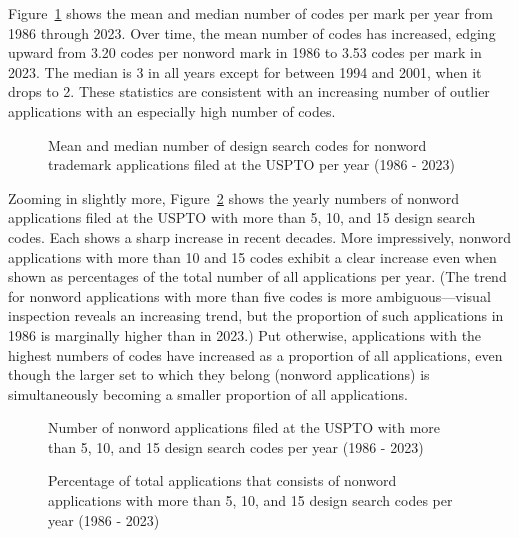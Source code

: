 \documentclass[letterpaper, 11pt, oneside]{article}
\begin{document}
%

Figure~\ref{fig:4} shows the mean and median number of codes per mark per year from 1986 through 2023. Over time, the mean number of codes has increased, edging upward from 3.20 codes per nonword mark in 1986 to 3.53 codes per mark in 2023. The median is 3 in all years except for between 1994 and 2001, when it drops to 2. These statistics are consistent with an increasing number of outlier applications with an especially high number of codes.

\begin{figure}[H]
\centering

\caption{\label{fig:4} Mean and median number of design search codes for nonword trademark applications filed at the USPTO per year (1986 - 2023)}
\end{figure}

Zooming in slightly more, Figure~\ref{fig:5} shows the yearly numbers of nonword applications filed at the USPTO with more than 5, 10, and 15 design search codes. Each shows a sharp increase in recent decades. More impressively, nonword applications with more than 10 and 15 codes exhibit a clear increase even when shown as percentages of the total number of all applications per year. (The trend for nonword applications with more than five codes is more ambiguous—visual inspection reveals an increasing trend, but the proportion of such applications in 1986 is marginally higher than in 2023.) Put otherwise, applications with the highest numbers of codes have increased as a proportion of all applications, even though the larger set to which they belong (nonword applications) is simultaneously becoming a smaller proportion of all applications.

\begin{figure}[H]
\centering

\caption{\label{fig:5} Number of nonword applications filed at the USPTO with more than 5, 10, and 15 design search codes per year (1986 - 2023)}
\end{figure}

\begin{figure}[H]
\centering

\caption{\label{fig:6} Percentage of total applications that consists of nonword applications with more than 5, 10, and 15 design search codes per year (1986 - 2023)}
\end{figure}
\end{document}
